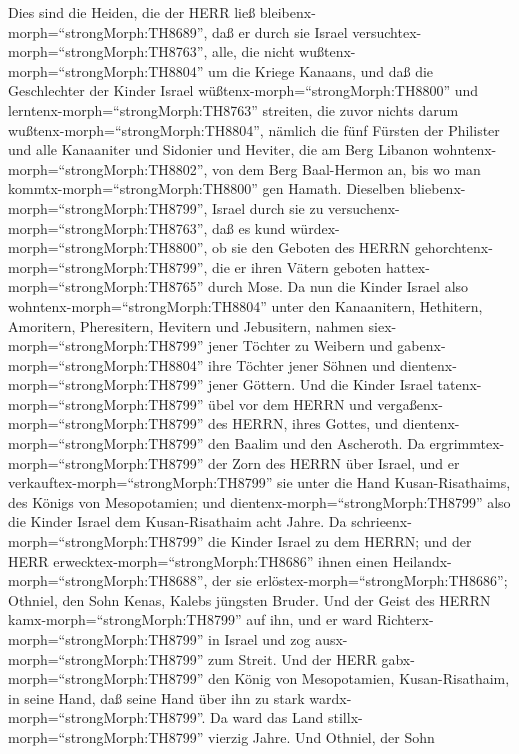  Dies sind die Heiden, die der HERR ließ
bleibenx-morph=``strongMorph:TH8689'', daß er durch sie Israel
versuchtex-morph=``strongMorph:TH8763'', alle, die nicht
wußtenx-morph=``strongMorph:TH8804'' um die Kriege Kanaans, 
und daß die Geschlechter der Kinder Israel
wüßtenx-morph=``strongMorph:TH8800'' und
lerntenx-morph=``strongMorph:TH8763'' streiten, die zuvor nichts darum
wußtenx-morph=``strongMorph:TH8804'',  nämlich die fünf
Fürsten der Philister und alle Kanaaniter und Sidonier und Heviter, die
am Berg Libanon wohntenx-morph=``strongMorph:TH8802'', von dem Berg
Baal-Hermon an, bis wo man kommtx-morph=``strongMorph:TH8800'' gen
Hamath.  Dieselben bliebenx-morph=``strongMorph:TH8799'',
Israel durch sie zu versuchenx-morph=``strongMorph:TH8763'', daß es kund
würdex-morph=``strongMorph:TH8800'', ob sie den Geboten des HERRN
gehorchtenx-morph=``strongMorph:TH8799'', die er ihren Vätern geboten
hattex-morph=``strongMorph:TH8765'' durch Mose.  Da nun die
Kinder Israel also wohntenx-morph=``strongMorph:TH8804'' unter den
Kanaanitern, Hethitern, Amoritern, Pheresitern, Hevitern und Jebusitern,
 nahmen siex-morph=``strongMorph:TH8799'' jener Töchter zu
Weibern und gabenx-morph=``strongMorph:TH8804'' ihre Töchter jener
Söhnen und dientenx-morph=``strongMorph:TH8799'' jener Göttern.
 Und die Kinder Israel tatenx-morph=``strongMorph:TH8799''
übel vor dem HERRN und vergaßenx-morph=``strongMorph:TH8799'' des HERRN,
ihres Gottes, und dientenx-morph=``strongMorph:TH8799'' den Baalim und
den Ascheroth.  Da ergrimmtex-morph=``strongMorph:TH8799''
der Zorn des HERRN über Israel, und er
verkauftex-morph=``strongMorph:TH8799'' sie unter die Hand
Kusan-Risathaims, des Königs von Mesopotamien; und
dientenx-morph=``strongMorph:TH8799'' also die Kinder Israel dem
Kusan-Risathaim acht Jahre.  Da
schrieenx-morph=``strongMorph:TH8799'' die Kinder Israel zu dem HERRN;
und der HERR erwecktex-morph=``strongMorph:TH8686'' ihnen einen
Heilandx-morph=``strongMorph:TH8688'', der sie
erlöstex-morph=``strongMorph:TH8686''; Othniel, den Sohn Kenas, Kalebs
jüngsten Bruder.  Und der Geist des HERRN
kamx-morph=``strongMorph:TH8799'' auf ihn, und er ward
Richterx-morph=``strongMorph:TH8799'' in Israel und zog
ausx-morph=``strongMorph:TH8799'' zum Streit. Und der HERR
gabx-morph=``strongMorph:TH8799'' den König von Mesopotamien,
Kusan-Risathaim, in seine Hand, daß seine Hand über ihn zu stark
wardx-morph=``strongMorph:TH8799''.  Da ward das Land
stillx-morph=``strongMorph:TH8799'' vierzig Jahre. Und Othniel, der Sohn
